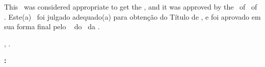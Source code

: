


\begin{folhadeaprovacao}

    \begin{center}
        {\imprimirautor}

        \begin{center}
            \ABNTEXchapterfont\bfseries\MakeUppercase{\imprimirtitulo}\ifnotempty{\imprimirsubtitulo}{: \imprimirsubtitulo}
        \end{center}

        \begin{minipage}{\textwidth}
            \lang
            {
                This \imprimirtipotrabalho~was considered appropriate to get the \imprimirformacao,
                and it was approved by the \imprimirprograma~of \imprimircentro~of \imprimirinstituicao.
            }
            {
                Este(a) \imprimirtipotrabalho~foi julgado adequado(a) para obtenção do Título de \imprimirformacao,
                e foi aprovado em sua forma final pelo \imprimirprograma~
                do \imprimircentro~da \imprimirinstituicao.
            }
        \end{minipage}%
    \end{center}

    \begin{center}
        \imprimirlocal, \imprimirdata.
    \end{center}


    \begin{center}
        \textbf{:}
    \end{center}

    \assinatura{%
        \textbf{\imprimirorientador} \\ \imprimirorientadorRotulo\\
        \imprimirinstituicao~--~\imprimirinstituicaosigla
    }

    \ifnotempty{\imprimircoorientador}{%
        \assinatura{%
            \textbf{\imprimircoorientador} \\ \imprimircoorientadorRotulo \\
            \imprimirinstituicao~--~\imprimirinstituicaosigla
        }
    }


\end{folhadeaprovacao}
